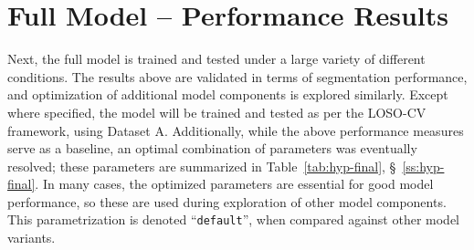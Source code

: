 \section{Full Model -- Performance Results}
Next, the full model is trained and tested under a large variety of different conditions.
The results above are validated in terms of segmentation performance,
and optimization of additional model components is explored similarly.
Except where specified, the model will be trained and tested
as per the LOSO-CV framework, using Dataset A.
Additionally, while the above performance measures serve as a baseline,
an optimal combination of parameters was eventually resolved;
these parameters are summarized in Table~\ref{tab:hyp-final}, \S~\ref{ss:hyp-final}.
In many cases, the optimized parameters are essential for good model performance,
so these are used during exploration of other model components.
This parametrization is denoted ``\texttt{default}'', when compared against other model variants.

